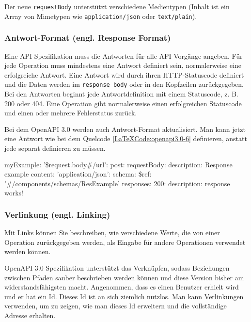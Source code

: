 Der neue \texttt{requestBody} unterstützt verschiedene Medientypen (Inhalt ist ein Array von Mimetypen wie \texttt{application/json} oder \texttt{text/plain}).

\subsubsection{Antwort-Format (engl. Response Format)}

Eine API-Spezifikation muss die Antworten für alle API-Vorgänge angeben. Für jede Operation muss mindestens eine Antwort definiert sein, normalerweise eine erfolgreiche Antwort. Eine Antwort wird durch ihren HTTP-Statuscode definiert und die Daten werden im \texttt{response body} oder in den Kopfzeilen zurückgegeben. Bei den Antworten beginnt jede Antwortdefinition mit einem Statuscode, z. B. 200 oder 404. Eine Operation gibt normalerweise einen erfolgreichen Statuscode und einen oder mehrere Fehlerstatus zurück\cite{openapiresponsebody17}.

Bei dem OpenAPI 3.0 werden auch Antwort-Format aktualisiert. Man kann jetzt eine Antwort wie bei dem Quelcode \ref{LaTeXCode:openapi3.0-6} definieren, anstatt jede separat definieren zu müssen.

\begin{LaTeXCode}[caption={Open API 3.0 - Antwort-Format},captionpos=b, label=LaTeXCode:openapi3.0-6][numbers=none]
myExample:
	'\$request.body#/url':
	post:
		requestBody:
		  description: Response example
	    content:
		  'application/json':
		    schema:
			  \$ref: '#/components/schemas/ResExample'
			responses:
			  200:
			  description: response works!
\end{LaTeXCode}


\subsubsection{Verlinkung (engl. Linking)}

Mit Links können Sie beschreiben, wie verschiedene Werte, die von einer Operation zurückgegeben werden, als Eingabe für andere Operationen verwendet werden können\cite{openapilinks17}.

OpenAPI 3.0 Spezifikation unterstützt das Verknüpfen, sodass Beziehungen zwischen Pfaden sauber beschrieben werden können und diese Version bisher am widerstandsfähigsten macht. Angenommen, dass es einen Benutzer erhielt wird und er hat ein Id. Dieses Id ist an sich ziemlich nutzlos. Man kann Verlinkungen verwenden, um zu zeigen, wie man dieses Id erweitern und die vollständige Adresse erhalten.

